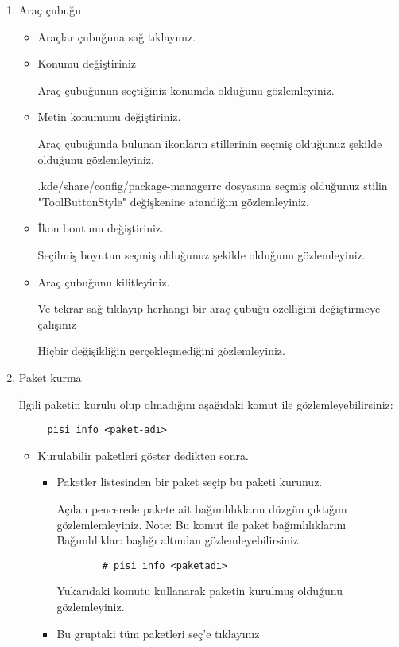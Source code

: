 \documentclass[a4paper,10pt]{article}
\begin{document}
\begin{enumerate}
    \item Araç çubuğu
    \begin{itemize}
        \item Araçlar çubuğuna sağ tıklayınız.

        \item Konumu değiştiriniz
      
	Araç çubuğunun seçtiğiniz konumda olduğunu gözlemleyiniz.
        \item Metin konumunu değiştiriniz.

	    Araç çubuğunda bulunan ikonların stillerinin seçmiş olduğunuz şekilde olduğunu gözlemleyiniz.
            
	    .kde/share/config/package-managerrc dosyasına seçmiş olduğunuz stilin "ToolButtonStyle" değişkenine atandiğını gözlemleyiniz.

        \item İkon boutunu değiştiriniz.
      
	Seçilmiş boyutun seçmiş olduğunuz şekilde olduğunu gözlemleyiniz.
        \item Araç çubuğunu kilitleyiniz.
    
            Ve tekrar sağ tıklayıp herhangi bir araç çubuğu özelliğini değiştirmeye çalışınız
	    
	    Hiçbir değişikliğin gerçekleşmediğini gözlemleyiniz.
    \end{itemize}


    \item Paket kurma
	
		
	İlgili paketin kurulu olup olmadığını aşağıdaki komut ile gözlemleyebilirsiniz:
	\begin{verbatim}
	 pisi info <paket-adı>
	\end{verbatim}

        \begin{itemize}
            \item Kurulabilir paketleri göster dedikten sonra. 
            \begin{itemize}
                \item Paketler listesinden bir paket seçip bu paketi kurunuz.
		
		Açılan pencerede pakete ait bağımlılıkların düzgün çıktığını gözlemlemleyiniz.	
	 	Note: Bu komut ile paket bağımlılıklarını Bağımlılıklar: başlığı altından gözlemleyebilirsiniz.
		\begin{verbatim}
		# pisi info <paketadı>
		\end{verbatim}
		Yukarıdaki komutu kullanarak paketin kurulmuş olduğunu gözlemleyiniz.
                \item Bu gruptaki tüm paketleri seç'e tıklayınız 


\end{itemize}
\end{itemize}
\end{enumerate}
\end{document}
